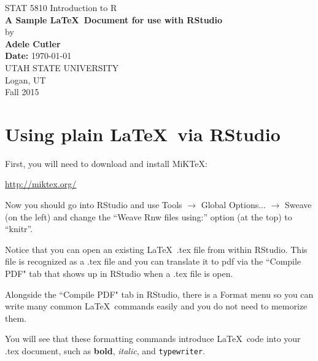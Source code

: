 \documentclass[12pt]{article}
\begin{document}
\begin{titlepage}

\begin{center}
{\large STAT 5810 Introduction to R} \\[1.5in]

{\LARGE \bf A Sample \LaTeX\ Document for use with RStudio} \\[.4in]
by \\[.4in]
{\bf Adele Cutler} \\[1in]
{\bf Date:} \today \\[.8in]

UTAH STATE UNIVERSITY \\[.2in]
Logan, UT \\[0.2in]
Fall 2015 \\[0.2in]
\end{center}

\thispagestyle{empty}
\vfill
\end{titlepage}


\newpage 


\tableofcontents


\newpage



\section{Using plain \LaTeX\ via RStudio}

First, you will need to download and install  MiKTeX: 

\url{http://miktex.org/}

Now you should go into RStudio and use Tools $\rightarrow$ Global Options... $\rightarrow$ Sweave (on the left) and change the ``Weave Rnw files using:'' option (at the top) to ``knitr''. 

Notice that you can open an existing \LaTeX\ .tex file from within RStudio.
This file is recognized as a .tex file and you can translate it to pdf
via the ``Compile PDF" tab that shows up in RStudio when a .tex file is open.

Alongside the ``Compile PDF" tab in RStudio, there is a Format menu so you can write many common \LaTeX\ commands easily and you do not need to memorize them.

You will see that these formatting commands introduce \LaTeX\ code into your .tex document, such as \textbf{bold}, \emph{italic}, and \texttt{typewriter}.
\end{document}
